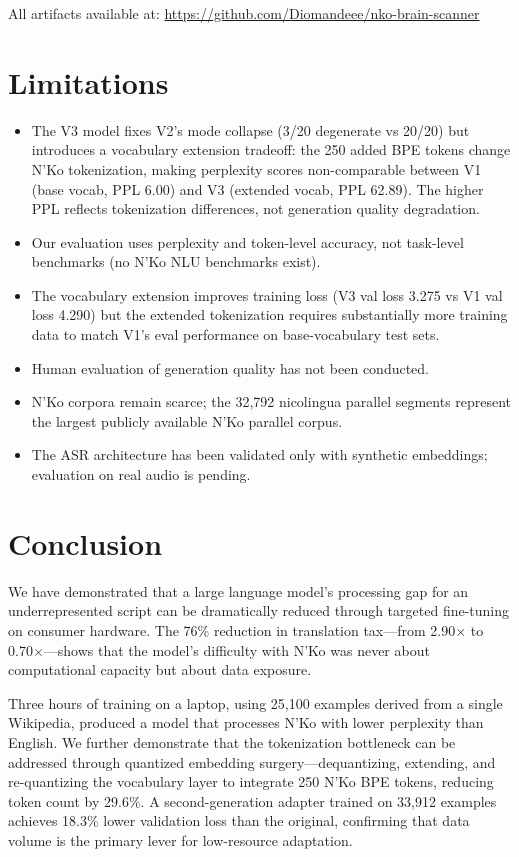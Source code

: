 \documentclass[11pt]{article}
\begin{document}
All artifacts available at: \url{https://github.com/Diomandeee/nko-brain-scanner}

\section{Limitations}

\begin{itemize}
\item The V3 model fixes V2's mode collapse (3/20 degenerate vs 20/20) but introduces a vocabulary extension tradeoff: the 250 added BPE tokens change N'Ko tokenization, making perplexity scores non-comparable between V1 (base vocab, PPL 6.00) and V3 (extended vocab, PPL 62.89). The higher PPL reflects tokenization differences, not generation quality degradation.
\item Our evaluation uses perplexity and token-level accuracy, not task-level benchmarks (no N'Ko NLU benchmarks exist).
\item The vocabulary extension improves training loss (V3 val loss 3.275 vs V1 val loss 4.290) but the extended tokenization requires substantially more training data to match V1's eval performance on base-vocabulary test sets.
\item Human evaluation of generation quality has not been conducted.
\item N'Ko corpora remain scarce; the 32,792 nicolingua parallel segments represent the largest publicly available N'Ko parallel corpus.
\item The ASR architecture has been validated only with synthetic embeddings; evaluation on real audio is pending.
\end{itemize}

\section{Conclusion}

We have demonstrated that a large language model's processing gap for an underrepresented script can be dramatically reduced through targeted fine-tuning on consumer hardware.
The 76\% reduction in translation tax---from 2.90$\times$ to 0.70$\times$---shows that the model's difficulty with N'Ko was never about computational capacity but about data exposure.

Three hours of training on a laptop, using 25,100 examples derived from a single Wikipedia, produced a model that processes N'Ko with lower perplexity than English.
We further demonstrate that the tokenization bottleneck can be addressed through quantized embedding surgery---dequantizing, extending, and re-quantizing the vocabulary layer to integrate 250 N'Ko BPE tokens, reducing token count by 29.6\%.
A second-generation adapter trained on 33,912 examples achieves 18.3\% lower validation loss than the original, confirming that data volume is the primary lever for low-resource adaptation.
\end{document}
